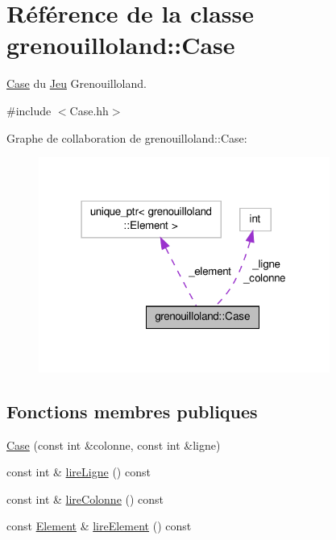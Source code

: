 \hypertarget{classgrenouilloland_1_1Case}{\section{Référence de la classe grenouilloland\-:\-:Case}
\label{classgrenouilloland_1_1Case}
}


\hyperlink{classgrenouilloland_1_1Case}{Case} du \hyperlink{classgrenouilloland_1_1Jeu}{Jeu} Grenouilloland.  




{\ttfamily \#include $<$Case.\-hh$>$}



Graphe de collaboration de grenouilloland\-:\-:Case\-:
\nopagebreak
\begin{figure}[H]
\begin{center}
\leavevmode
\includegraphics[width=271pt]{classgrenouilloland_1_1Case__coll__graph}
\end{center}
\end{figure}
\subsection*{Fonctions membres publiques}
\begin{DoxyCompactItemize}
\item 
\hyperlink{classgrenouilloland_1_1Case_a70869d260d32a037b2f72b56990abc42}{Case} (const int \&colonne, const int \&ligne)
\item 
const int \& \hyperlink{classgrenouilloland_1_1Case_aedf4adbcb065ba1f3d178dccd0a54679}{lire\-Ligne} () const 
\item 
const int \& \hyperlink{classgrenouilloland_1_1Case_a58ddf443efa9e649e9a9e61b019ec3b8}{lire\-Colonne} () const 
\item 
const \hyperlink{classgrenouilloland_1_1Element}{Element} \& \hyperlink{classgrenouilloland_1_1Case_a823dafb736c38d71b6a3192cd6a3d0fd}{lire\-Element} () const 
\end{DoxyCompactItemize}
